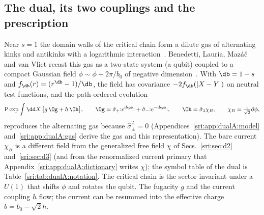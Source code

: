 \subsection{The dual, its two couplings and the prescription}\label{sri:sec:dual}
Near $s=1$ the domain walls of the critical chain form a dilute gas of alternating kinks and antikinks with a
logarithmic interaction~\cite{sri:Anderson:1970kyb,sri:Kosterlitz:1976zz}. Benedetti, Lauria, Maz\'a\v c and van Vliet recast
this gas as a two-state system (a qubit) coupled to a compact Gaussian field $\phi\sim\phi+2\pi/b_0$ of negative
dimension~\cite{sri:Benedetti:2024wgx,sri:Benedetti:2025nzp}. With $\db=1-s$ and $f_{\db}(r)=(r^{\db}-1)/\db$, the field has
covariance $-2f_{\db}(|X-Y|)$ on neutral test functions, and the path-ordered evolution
\begin{equation}
 \mathrm P\exp\int\dd X\,\bigl[g\,\Og+h\,\Oh\bigr],\qquad
 \Og=\hat\sigma_+{:}e^{\mathrm i b_0\phi}{:}+\hat\sigma_-{:}e^{-\mathrm i b_0\phi}{:},\qquad
 \Oh=\hat\sigma_3\chi_B,\qquad \chi_B=\tfrac{\mathrm i}{\sqrt2}\partial\phi,
 \label{sri:eq:dual}
\end{equation}
reproduces the alternating gas because $\hat\sigma_\pm^2=0$ (Appendices~\ref{sri:app:dualA:model}
and~\ref{sri:app:dualA:gas} derive the gas and this representation). The bare current $\chi_B$ is a different field from the generalized free
field $\chi$ of Secs.~\ref{sri:sec:d2} and~\ref{sri:sec:d3} (and from the renormalized current primary that
Appendix~\ref{sri:app:dualA:dictionary} writes $\chi$); the symbol table of the dual is Table~\ref{sri:tab:dualA:notation}. The critical chain is the sector invariant under a $U(1)$
that shifts $\phi$ and rotates the qubit. The fugacity $g$ and the current coupling $h$ flow; the current can be
resummed into the effective charge $b=b_0-\sqrt2h$.

